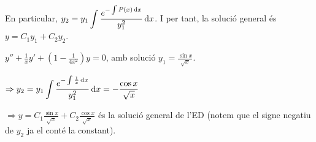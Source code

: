 En particular, $\displaystyle y_{2} = y_{1} \int \frac{e^{-\int P(x) \mathop{}\!\mathrm{d} x}}{y_{1}^{2}} \mathop{}\!\mathrm{d} x$. I per tant, la solució general és $\boxed{y = C_{1}y_{1} + C_{2} y_{2}}$.
\begin{example}
    $\displaystyle y'' + \frac{1}{x} y' + \left( 1 - \frac{1}{4x^{2}} \right) y = 0$, amb solució $\displaystyle y_{1} = \frac{\sin x}{\sqrt{x}}$.

    $\Rightarrow \displaystyle y_{2} = y_{1} \int \frac{e^{-\int \frac{1}{x} \mathop{}\!\mathrm{d} x}}{y_{1}^{2}} \mathop{}\!\mathrm{d} x = - \frac{\cos x}{\sqrt{x}}$

    $\Rightarrow \boxed{y = C_{1} \frac{\sin x}{\sqrt{x}} + C_{2} \frac{\cos x}{\sqrt{x}}}$ és la solució general de l'ED (notem que el signe negatiu de $y_{2}$ ja el conté la constant).
\end{example}





